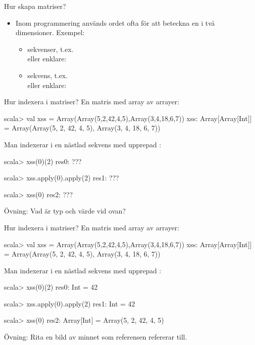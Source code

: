 \begin{Slide}{Hur skapa matriser?}
  \setlength{\leftmargini}{0pt}

  \begin{itemize}
  \item Inom programmering används ordet  ofta för att beteckna en  i två dimensioner. Exempel:
  \begin{itemize}
   \item {} sekvenser, t.ex.  \\
    eller enklare: \\

    \item {} sekvens, t.ex.  \\
     eller enklare: \\

  \end{itemize}

\end{itemize}
\end{Slide}

\begin{Slide}{Hur indexera i matriser?}
En matris med array av arrayer:
\begin{REPL}
scala> val xss = Array(Array(5,2,42,4,5),Array(3,4,18,6,7))
xss: Array[Array[Int]] = Array(Array(5, 2, 42, 4, 5), Array(3, 4, 18, 6, 7))
\end{REPL}
\pause
Man indexerar i en nästlad sekvens med upprepad :
\begin{REPL}
scala> xss(0)(2)
res0: ???

scala> xss.apply(0).apply(2)
res1: ???

scala> xss(0)
res2: ???
\end{REPL}
Övning: Vad är typ och värde vid  ovan?
\end{Slide}

\begin{Slide}{Hur indexera i matriser?}
En matris med array av arrayer:
\begin{REPL}
scala> val xss = Array(Array(5,2,42,4,5),Array(3,4,18,6,7))
xss: Array[Array[Int]] = Array(Array(5, 2, 42, 4, 5), Array(3, 4, 18, 6, 7))
\end{REPL}

Man indexerar i en nästlad sekvens med upprepad :
\begin{REPL}
scala> xss(0)(2)
res0: Int = 42

scala> xss.apply(0).apply(2)
res1: Int = 42

scala> xss(0)
res2: Array[Int] = Array(5, 2, 42, 4, 5)
\end{REPL}
Övning: Rita en bild av minnet som referensen  refererar till.

\end{Slide}

